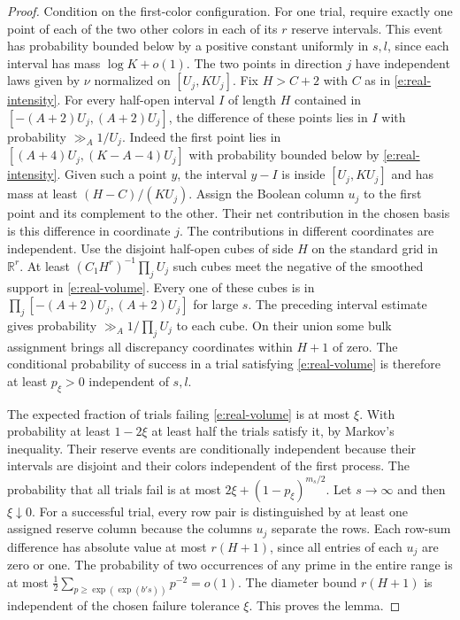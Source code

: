 \documentclass[11pt]{article}
\numberwithin{equation}{section}
\begin{document}
\begin{proof}
Condition on the first-color configuration. For one trial, require
exactly one point of each of the two other colors in each of its $r$
reserve intervals. This event has probability bounded below by a
positive constant uniformly in $s,l$, since each interval has mass
$\log K+o(1)$. The two points in direction $j$ have independent laws
given by $\nu$ normalized on $[U_j,KU_j]$. Fix $H>C+2$ with $C$ as
in \eqref{e:real-intensity}. For every half-open interval $I$ of
length $H$ contained in $[-(A+2)U_j,(A+2)U_j]$, the difference
of these points lies in $I$ with probability $\gg_A 1/U_j$.
Indeed the first point lies in $[(A+4)U_j,(K-A-4)U_j]$ with
probability bounded below by \eqref{e:real-intensity}. Given such a
point $y$, the interval $y-I$ is inside $[U_j,KU_j]$ and has mass
at least $(H-C)/(KU_j)$. Assign the Boolean column
$u_j$ to the first point and its complement to the other. Their net
contribution in the chosen basis is this difference in coordinate $j$.
The contributions in different coordinates are independent. Use the
disjoint half-open cubes of side $H$ on the standard grid in
$\mathbb R^r$. At least $(C_1H^r)^{-1}\prod_j U_j$ such cubes meet
the negative of the smoothed support in \eqref{e:real-volume}. Every
one of these cubes is in $\prod_j[-(A+2)U_j,(A+2)U_j]$ for large $s$.
The preceding interval estimate gives probability $\gg_A1/\prod_j U_j$
to each cube. On their union some bulk assignment brings all
discrepancy coordinates within $H+1$ of zero. The conditional
probability of success in a trial satisfying \eqref{e:real-volume}
is therefore at least $p_\xi>0$ independent of $s,l$.

The expected fraction of trials failing \eqref{e:real-volume} is
at most $\xi$. With probability at least $1-2\xi$ at least half the
trials satisfy it, by Markov's inequality. Their reserve events are
conditionally independent because their intervals are disjoint and
their colors independent of the first process. The probability that
all trials fail is at most $2\xi+(1-p_\xi)^{m_s/2}$. Let $s\to\infty$
and then $\xi\downarrow0$. For a successful trial, every row pair is
distinguished by at least one assigned reserve column because the
columns $u_j$ separate the rows. Each row-sum difference has absolute
value at most $r(H+1)$, since all entries of each $u_j$ are zero or
one. The probability of two occurrences of any prime in the entire
range is at most $\tfrac12\sum_{p\ge\exp(\exp(b's))}p^{-2}=o(1)$.
The diameter bound $r(H+1)$ is independent of the chosen failure
tolerance $\xi$. This proves the lemma.
\end{proof}
\end{document}
